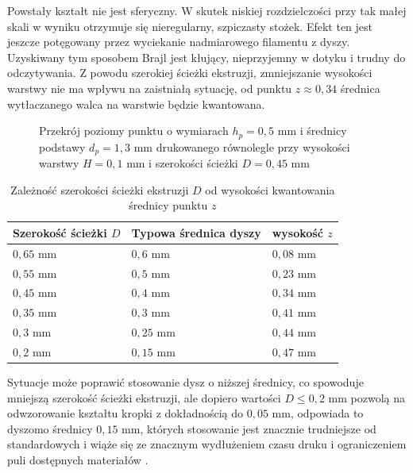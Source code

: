 \documentclass[12pt,a4paper]{article}
\begin{document}
Powstały kształt nie jest sferyczny. W skutek niskiej rozdzielczości przy tak małej skali w wyniku otrzymuje się nieregularny, szpiczasty stożek. Efekt ten jest jeszcze potęgowany przez wyciekanie nadmiarowego filamentu z dyszy.
Uzyskiwany tym sposobem Brajl jest kłujący, nieprzyjemny w dotyku i trudny do odczytywania.
Z powodu szerokiej ścieżki ekstruzji, zmniejszanie wysokości warstwy nie ma wpływu na zaistniałą sytuację, od punktu $z \approx 0,34$ średnica wytłaczanego walca na warstwie będzie kwantowana.

\begin{figure}
\centering
{}
\caption{Przekrój poziomy punktu o wymiarach $h_p = 0{,}5 \text{ mm}$ i średnicy podstawy $d_p=1{,}3 \text{ mm}$ drukowanego równolegle przy wysokości warstwy $H = 0{,}1 \text{ mm}$ i szerokości ścieżki $D = 0{,}45 \text{ mm}$}
\end{figure}

\begin{table}[t]
\caption{Zależność szerokości ścieżki ekstruzji $D$ od wysokości kwantowania średnicy punktu $z$}
\begin{tabular}{|l|l|l|}
\hline
Szerokość ścieżki $D$ & Typowa średnica dyszy & wysokość $z$ \\
\hline
$0{,}65 \text{ mm}$ & $0{,}6 \text{ mm}$ & $0{,}08 \text{ mm}$ \\
\hline
$0{,}55 \text{ mm}$ & $0{,}5 \text{ mm}$ & $0{,}23 \text{ mm}$ \\
\hline
$0{,}45 \text{ mm}$ & $0{,}4 \text{ mm}$ & $0{,}34 \text{ mm}$ \\
\hline
$0{,}35 \text{ mm}$ & $0{,}3 \text{ mm}$ & $0{,}41 \text{ mm}$ \\
\hline
$0{,}3 \text{ mm}$ & $0{,}25 \text{ mm}$ & $0{,}44 \text{ mm}$ \\
\hline
$0{,}2 \text{ mm}$ & $0{,}15 \text{ mm}$ & $0{,}47 \text{ mm}$ \\
\hline
\end{tabular} 
\end{table}

Sytuacje może poprawić stosowanie dysz o niższej średnicy, co spowoduje mniejszą szerokość ścieżki ekstruzji, ale dopiero wartości $D \leq 0{,}2 \text{ mm}$ pozwolą na odwzorowanie kształtu kropki z dokładnością do $0{,}05 \text{ mm}$, odpowiada to dyszomo średnicy $0{,}15 \text{ mm}$, których stosowanie jest znacznie trudniejsze od standardowych i wiąże się ze znacznym wydłużeniem czasu druku i ograniczeniem puli dostępnych materiałów \cite{e3d15}.
\end{document}
